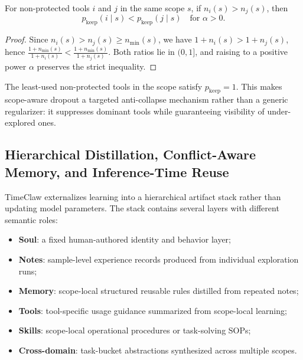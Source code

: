 \begin{proposition}[Monotonicity]
\label{prop:mono}
For non-protected tools $i$ and $j$ in the same scope $s$, if $n_i(s) > n_j(s)$, then
\begin{equation}
p_{\mathrm{keep}}(i \mid s) < p_{\mathrm{keep}}(j \mid s)
\quad \text{for } \alpha > 0.
\end{equation}
\end{proposition}
\begin{proof}
Since $n_i(s)>n_j(s)\ge n_{\min}(s)$, we have $1+n_i(s)>1+n_j(s)$, hence $\frac{1+n_{\min}(s)}{1+n_i(s)} < \frac{1+n_{\min}(s)}{1+n_j(s)}$. Both ratios lie in $(0,1]$, and raising to a positive power $\alpha$ preserves the strict inequality.
\end{proof}

The least-used non-protected tools in the scope satisfy $p_{\mathrm{keep}}=1$. This makes scope-aware dropout a targeted anti-collapse mechanism rather than a generic regularizer: it suppresses dominant tools while guaranteeing visibility of under-explored ones.

\subsection{Hierarchical Distillation, Conflict-Aware Memory, and Inference-Time Reuse}
\label{sec:distillation}

TimeClaw externalizes learning into a hierarchical artifact stack rather than updating model parameters. The stack contains several layers with different semantic roles:
\begin{itemize}[leftmargin=*,itemsep=2pt]
    \item \textbf{Soul}: a fixed human-authored identity and behavior layer;
    \item \textbf{Notes}: sample-level experience records produced from individual exploration runs;
    \item \textbf{Memory}: scope-local structured reusable rules distilled from repeated notes;
    \item \textbf{Tools}: tool-specific usage guidance summarized from scope-local learning;
    \item \textbf{Skills}: scope-local operational procedures or task-solving SOPs;
    \item \textbf{Cross-domain}: task-bucket abstractions synthesized across multiple scopes.
\end{itemize}

